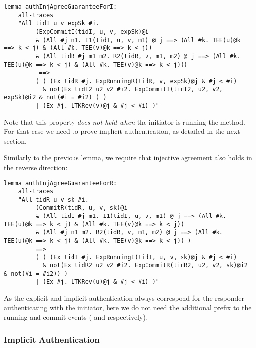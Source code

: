 
\begin{lstlisting}
lemma authInjAgreeGuaranteeForI:
    all-traces
    "All tidI u v expSk #i.
         (ExpCommitI(tidI, u, v, expSk)@i
	     & (All #j m1. I1(tidI, u, v, m1) @ j ==> (All #k. TEE(u)@k ==> k < j) & (All #k. TEE(v)@k ==> k < j))
         & (All tidR #j m1 m2. R2(tidR, v, m1, m2) @ j ==> (All #k. TEE(u)@k ==> k < j) & (All #k. TEE(v)@k ==> k < j)))
          ==>
         ( ( (Ex tidR #j. ExpRunningR(tidR, v, expSk)@j & #j < #i)
           & not(Ex tidI2 u2 v2 #i2. ExpCommitI(tidI2, u2, v2, expSk)@i2 & not(#i = #i2) ) )
         | (Ex #j. LTKRev(v)@j & #j < #i) )"
\end{lstlisting}

Note that this property \emph{does not hold when} the initiator is
running the \mStat{} method.
%
For that case we need to prove implicit authentication, as detailed in
the next section.

Similarly to the previous lemma, we require that injective agreement also holds
in the reverse direction:

\begin{lstlisting}
lemma authInjAgreeGuaranteeForR:
    all-traces
    "All tidR u v sk #i.
         (CommitR(tidR, u, v, sk)@i
	     & (All tidI #j m1. I1(tidI, u, v, m1) @ j ==> (All #k. TEE(u)@k ==> k < j) & (All #k. TEE(v)@k ==> k < j))
         & (All #j m1 m2. R2(tidR, v, m1, m2) @ j ==> (All #k. TEE(u)@k ==> k < j) & (All #k. TEE(v)@k ==> k < j)) )
         ==>
         ( ( (Ex tidI #j. ExpRunningI(tidI, u, v, sk)@j & #j < #i)
           & not(Ex tidR2 u2 v2 #i2. ExpCommitR(tidR2, u2, v2, sk)@i2 & not(#i = #i2)) )
         | (Ex #j. LTKRev(u)@j & #j < #i) )"
\end{lstlisting}

As the explicit and implicit authentication always correspond for the
responder authenticating with the initiator, here we do not need the
additional  prefix to the running and commit events
( and  respectively).

\spacehack
\subsubsection{Implicit Authentication}

